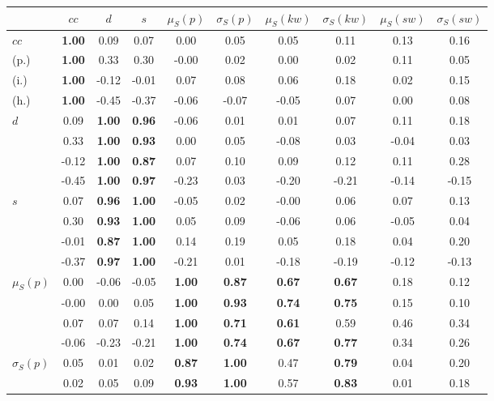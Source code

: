 \begin{table*}[h!]
\begin{center}
\begin{tabular}{| l || c | c | c | c | c | c | c | c | c |}\hline
 & $cc$ & $d$ & $s$ & $\mu_S(p)$ & $\sigma_S(p)$ & $\mu_S(kw)$ & $\sigma_S(kw)$ & $\mu_S(sw)$ & $\sigma_S(sw)$ \\\hline\hline
$cc$ & {\bf 1.00} & 0.09 & 0.07 & 0.00 & 0.05 & 0.05 & 0.11 & 0.13 & 0.16 \\
(p.) & {\bf 1.00} & 0.33 & 0.30 & -0.00 & 0.02 & 0.00 & 0.02 & 0.11 & 0.05 \\
(i.) & {\bf 1.00} & -0.12 & -0.01 & 0.07 & 0.08 & 0.06 & 0.18 & 0.02 & 0.15 \\
(h.) & {\bf 1.00} & -0.45 & -0.37 & -0.06 & -0.07 & -0.05 & 0.07 & 0.00 & 0.08 \\\hline
$d$ & 0.09 & {\bf 1.00} & {\bf 0.96} & -0.06 & 0.01 & 0.01 & 0.07 & 0.11 & 0.18 \\
 & 0.33 & {\bf 1.00} & {\bf 0.93} & 0.00 & 0.05 & -0.08 & 0.03 & -0.04 & 0.03 \\
 & -0.12 & {\bf 1.00} & {\bf 0.87} & 0.07 & 0.10 & 0.09 & 0.12 & 0.11 & 0.28 \\
 & -0.45 & {\bf 1.00} & {\bf 0.97} & -0.23 & 0.03 & -0.20 & -0.21 & -0.14 & -0.15 \\\hline
$s$ & 0.07 & {\bf 0.96} & {\bf 1.00} & -0.05 & 0.02 & -0.00 & 0.06 & 0.07 & 0.13 \\
 & 0.30 & {\bf 0.93} & {\bf 1.00} & 0.05 & 0.09 & -0.06 & 0.06 & -0.05 & 0.04 \\
 & -0.01 & {\bf 0.87} & {\bf 1.00} & 0.14 & 0.19 & 0.05 & 0.18 & 0.04 & 0.20 \\
 & -0.37 & {\bf 0.97} & {\bf 1.00} & -0.21 & 0.01 & -0.18 & -0.19 & -0.12 & -0.13 \\\hline
$\mu_S(p)$ & 0.00 & -0.06 & -0.05 & {\bf 1.00} & {\bf 0.87} & {\bf 0.67} & {\bf 0.67} & 0.18 & 0.12 \\
 & -0.00 & 0.00 & 0.05 & {\bf 1.00} & {\bf 0.93} & {\bf 0.74} & {\bf 0.75} & 0.15 & 0.10 \\
 & 0.07 & 0.07 & 0.14 & {\bf 1.00} & {\bf 0.71} & {\bf 0.61} & 0.59 & 0.46 & 0.34 \\
 & -0.06 & -0.23 & -0.21 & {\bf 1.00} & {\bf 0.74} & {\bf 0.67} & {\bf 0.77} & 0.34 & 0.26 \\\hline
$\sigma_S(p)$ & 0.05 & 0.01 & 0.02 & {\bf 0.87} & {\bf 1.00} & 0.47 & {\bf 0.79} & 0.04 & 0.20 \\
 & 0.02 & 0.05 & 0.09 & {\bf 0.93} & {\bf 1.00} & 0.57 & {\bf 0.83} & 0.01 & 0.18 \\

\end{tabular}
\end{center}
\end{table*}
